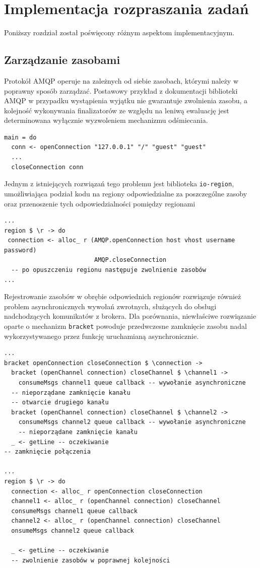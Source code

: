
\chapter{Implementacja rozpraszania zadań}
Poniższy rozdział został poświęcony różnym aspektom implementacyjnym.

\section{Zarządzanie zasobami}
Protokół AMQP operuje na zależnych od siebie zasobach, którymi należy w poprawny sposób zarządzać. Postawowy przykład z dokumentacji biblioteki AMQP w przypadku wystąpienia wyjątku nie gwarantuje zwolnienia zasobu, a kolejność wykonywania finalizatorów ze względu na leniwą ewaluację jest determinowana wyłącznie wyzwoleniem mechanizmu odśmiecania.

\begin{lstlisting}[caption=Łączenie z RabbitMQ]
main = do
  conn <- openConnection "127.0.0.1" "/" "guest" "guest"
  ...
  closeConnection conn
\end{lstlisting}

Jednym z istniejących rozwiązań tego problemu jest biblioteka \texttt{io-region}\cite{IoReg}, umożliwiająca podział kodu na regiony odpowiedzialne za poszczególne zasoby oraz przenoszenie tych odpowiedzialności pomiędzy regionami

\begin{lstlisting}[caption=Regionalizacja zasobów]
...
region $ \r -> do
 connection <- alloc_ r (AMQP.openConnection host vhost username password)
                         AMQP.closeConnection
  -- po opuszczeniu regionu następuje zwolnienie zasobów
...
\end{lstlisting}

Rejestrowanie zasobów w obrębie odpowiednich regionów rozwiązuje również problem asynchronicznych wywołań zwrotnych, służących do obsługi nadchodzących komunikatów z brokera. Dla porównania, niewłaściwe rozwiązanie oparte o mechanizm \lstinline{bracket} powoduje przedwczesne zamknięcie zasobu nadal wykorzystywanego przez funkcję uruchamianą asynchronicznie.
\newpage
\begin{lstlisting}[caption=Problem funkcji asynchronicznych]
...
bracket openConnection closeConnection $ \connection ->
  bracket (openChannel connection) closeChannel $ \channel1 ->
    consumeMsgs channel1 queue callback -- wywołanie asynchroniczne
  -- nieporządane zamknięcie kanału
  -- otwarcie drugiego kanału
  bracket (openChannel connection) closeChannel $ \channel2 ->
    consumeMsgs channel2 queue callback -- wywołanie asynchroniczne
    -- nieporządane zamknięcie kanału
  _ <- getLine -- oczekiwanie
-- zamknięcie połączenia

...
region $ \r -> do
  connection <- alloc_ r openConnection closeConnection
  channel1 <- alloc_ r (openChannel connection) closeChannel
  consumeMsgs channel1 queue callback
  channel2 <- alloc_ r (openChannel connection) closeChannel
  onsumeMsgs channel2 queue callback

  _ <- getLine -- oczekiwanie
  -- zwolnienie zasobów w poprawnej kolejności
\end{lstlisting}
\newpage

